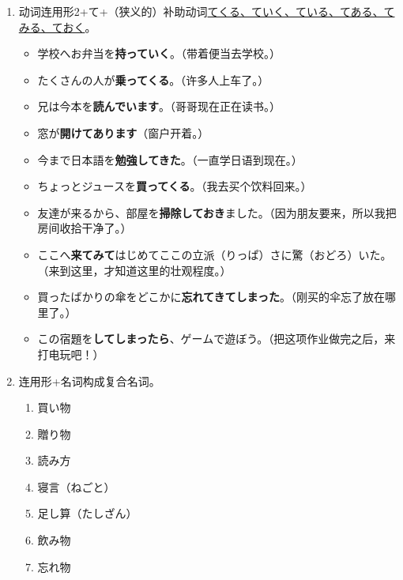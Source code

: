 \begin{enumerate}[A]
\begin{enumerate}[a]
        \item 动词连用形2+て+（狭义的）补助动词\href{https://www.zhihu.com/question/433110548/answer/1609376134}{てくる、ていく、ている、てある、てみる、ておく}。
        \begin{itemize}
            \item {\jp 学校へお弁当を{\bfseries 持っていく}。}（带着便当去学校。）
            \item {\jp たくさんの人が{\bfseries 乗ってくる}。}（许多人上车了。）
            \item {\jp 兄は今本を{\bfseries 読んでいます}。}（哥哥现在正在读书。）
            \item {\jp 窓が{\bfseries 開けてあります}}（窗户开着。）
            \item {\jp 今まで日本語を{\bfseries 勉強してきた}。}（一直学日语到现在。）
            \item {\jp ちょっとジュースを{\bfseries 買ってくる}。}（我去买个饮料回来。）
            \item {\jp 友達が来るから、部屋を{\bfseries 掃除しておき}ました。}（因为朋友要来，所以我把房间收拾干净了。）
            \item {\jp ここへ{\bfseries 来てみて}はじめてここの立派（りっぱ）さに驚（おどろ）いた。}（来到这里，才知道这里的壮观程度。）
            \item {\jp 買ったばかりの傘をどこかに{\bfseries 忘れてきてしまった}。}（刚买的伞忘了放在哪里了。）
            \item {\jp この宿題を{\bfseries してしまったら}、ゲームで遊ぼう。}（把这项作业做完之后，来打电玩吧！）
        \end{itemize}

        \item 连用形+名词构成复合名词。
        \begin{multicols}{2}
            \begin{enumerate}[1.]
                \item 買い物
                \item 贈り物
                \item 読み方
                \item 寝言（ねごと）
                \item 足し算（たしざん）
                \item 飲み物
                \item 忘れ物
            \end{enumerate}
    
        \end{multicols}


\end{enumerate}
\end{enumerate}
